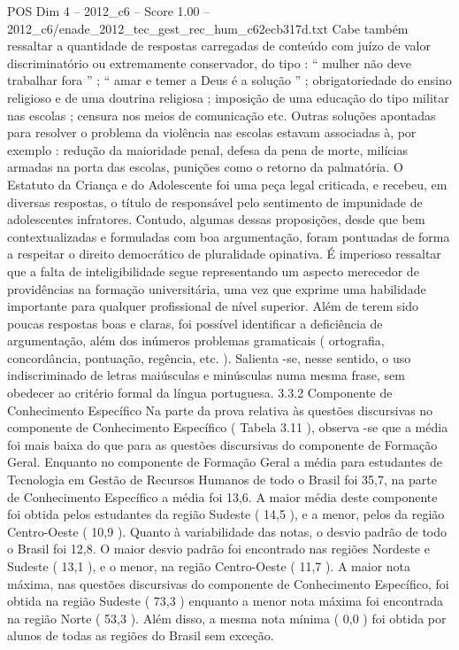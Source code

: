 \begin{textsample}{POS Dim 4 – 2012\_c6 – Score 1.00 – 2012\_c6/enade\_2012\_tec\_gest\_rec\_hum\_c62ecb317d.txt}
Cabe também ressaltar a quantidade de respostas carregadas de conteúdo com juízo de valor discriminatório ou extremamente conservador, do tipo : “ mulher não deve trabalhar fora ” ; “ amar e temer a Deus é a solução ” ; obrigatoriedade do ensino religioso e de uma doutrina religiosa ; imposição de uma educação do tipo militar nas escolas ; censura nos meios de comunicação etc.
Outras soluções apontadas para resolver o problema da violência nas escolas estavam associadas à, por exemplo : redução da maioridade penal, defesa da pena de morte, milícias armadas na porta das escolas, punições como o retorno da palmatória.
O Estatuto da Criança e do Adolescente foi uma peça legal criticada, e recebeu, em diversas respostas, o título de responsável pelo sentimento de impunidade de adolescentes infratores.
Contudo, algumas dessas proposições, desde que bem contextualizadas e formuladas com boa argumentação, foram pontuadas de forma a respeitar o direito democrático de pluralidade opinativa.
É imperioso ressaltar que a falta de inteligibilidade segue representando um aspecto merecedor de providências na formação universitária, uma vez que exprime uma habilidade importante para qualquer profissional de nível superior.
Além de terem sido poucas respostas boas e claras, foi possível identificar a deficiência de argumentação, além dos inúmeros problemas gramaticais ( ortografia, concordância, pontuação, regência, etc. ).
Salienta -se, nesse sentido, o uso indiscriminado de letras maiúsculas e minúsculas numa mesma frase, sem obedecer ao critério formal da língua portuguesa. 3.3.2 Componente de Conhecimento Específico Na parte da prova relativa às questões discursivas no componente de Conhecimento Específico ( Tabela 3.11 ), observa -se que a média foi mais baixa do que para as questões discursivas do componente de Formação Geral.
Enquanto no componente de Formação Geral a média para estudantes de Tecnologia em Gestão de Recursos Humanos de todo o Brasil foi 35,7, na parte de Conhecimento Específico a média foi 13,6.
A maior média deste componente foi obtida pelos estudantes da região Sudeste ( 14,5 ), e a menor, pelos da região Centro-Oeste ( 10,9 ).
Quanto à variabilidade das notas, o desvio padrão de todo o Brasil foi 12,8.
O maior desvio padrão foi encontrado nas regiões Nordeste e Sudeste ( 13,1 ), e o menor, na região Centro-Oeste ( 11,7 ).
A maior nota máxima, nas questões discursivas do componente de Conhecimento Específico, foi obtida na região Sudeste ( 73,3 ) enquanto a menor nota máxima foi encontrada na região Norte ( 53,3 ).
Além disso, a mesma nota mínima ( 0,0 ) foi obtida por alunos de todas as regiões do Brasil sem exceção.

\end{textsample}
